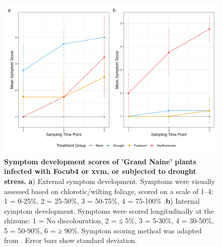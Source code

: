 \begin{figure}[b!]
    \centering
    \includegraphics[width=\textwidth]{Figures/Combined_Sympotoms_plot.png}
    \caption[Symptom development scores of 'Grand Naine' plants infected with \acl{Focub4} or \acl{xvm}, or subjected to drought stress.]{\textbf{Symptom development scores of 'Grand Naine' plants infected with \acf{Focub4} or \acf{xvm}, or subjected to drought stress.} \textbf{a}) External symptom development. Symptoms were visually assessed based on chlorotic/wilting foliage, scored on a scale of 1–4: 1 = 0-25\%, 2 = 25-50\%, 3 = 50-75\%, 4 = 75-100\% .\textbf{b}) Internal symptom development. Symptoms were scored longitudinally at the rhizome: 1 = No discolouration, 2 = ≤ 5\%, 3 = 5-30\%, 4 = 30-50\%, 5 = 50-90\%, 6 = ≥ 90\%. Symptom scoring method was adapted from \textcite{Garcia-Bastidas2019}. Error bars show standard deviation.}
    \label{fig:SymptomDev}
\end{figure}



